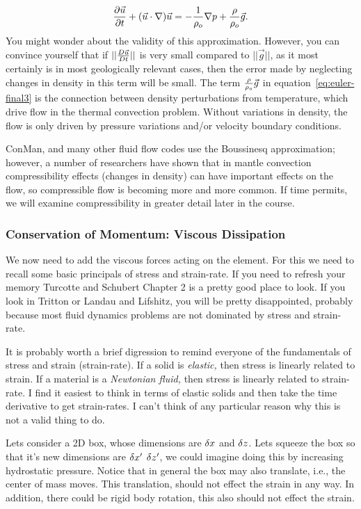 \documentclass[12pt,twoside]{article}
\begin{document}
\begin{equation}    
{{\partial \vec u} \over {\partial t}} + ( \vec u \cdot
\nabla ) \vec u =  - {1\over\rho_o}\nabla p + {\rho\over\rho_o}\vec g.
\label{eq:euler-final3}
\end{equation}
You might wonder about the validity of this approximation.   However, you can
convince yourself that if $||{{D \vec u} \over {D t}}||$ is very small compared
to $||\vec g||$, as it most certainly is in most geologically relevant cases,
then the error made by neglecting changes in density in this term will be
small. The term ${\rho\over\rho_o}\vec g$ in equation~\ref{eq:euler-final3} is
the connection between density perturbations from temperature, which drive flow
in the thermal convection problem.   Without variations in density, the flow is
only driven by pressure variations and/or velocity boundary conditions.

ConMan, and many other fluid flow codes use the Boussinesq approximation;
however, a number of researchers have shown that in mantle convection
compressibility effects (changes in density) can have important effects on the
flow, so compressible flow is becoming more and more common.   If time permits,
we will examine compressibility in greater detail later in the course.

\subsubsection{Conservation of Momentum: Viscous Dissipation}

We now need to add the viscous forces acting on the element.  For this we need
to recall some basic principals of stress and strain-rate.  If you need to
refresh your memory Turcotte and Schubert Chapter 2 is a pretty good place to
look.   If you look in Tritton or Landau and Lifshitz, you will be pretty
disappointed, probably because most fluid dynamics problems are not dominated
by stress and strain-rate.  

It is probably worth a brief digression to remind everyone of the fundamentals
of stress and strain (strain-rate).   If a solid is {\em elastic,} then
stress is linearly related to strain.   If a material is a {\em Newtonian
fluid,} then stress is linearly related to strain-rate.  I find it easiest to
think in terms of elastic solids and then take the time derivative to get
strain-rates.  I can't think of any particular reason why this is not a valid
thing to do. 

Lets consider a 2D box, whose dimensions are $\delta x$ and $\delta z$.  Lets squeeze the
box so that it's new dimensions are $\delta x^\prime$ $\delta z^\prime$, we could imagine
doing this by increasing hydrostatic pressure.   Notice that in general the box
may also translate, i.e., the center of mass moves.  This translation, should
not effect the strain in any way.   In addition, there could be rigid body
rotation, this also should not effect the strain.
\end{document}

